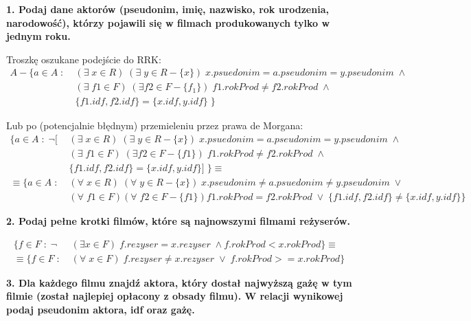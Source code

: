 \documentclass{article}
\begin{document}
\begin{solution}
  \textbf{\color{green}1. Podaj dane aktorów (pseudonim, imię, nazwisko, rok urodzenia, narodowość), którzy pojawili się w filmach produkowanych tylko w jednym roku.}

  Troszkę oszukane podejście do RRK:
  \begin{align*}
    A-\{a\in A\;:\; &(\exists\;x\in R)\;(\exists\;y\in R-\{x\})\;x.psuedonim = a.pseudonim = y.pseudonim\;\land\; \\ 
                    &(\exists\;f1\in F)\;(\exists f2\in F-\{f_1\})\;f1.rokProd \neq f2.rokProd \;\land\; \\ 
                    &\{f1.idf, f2.idf\}=\{x.idf, y.idf\}\;
                                     \}
  \end{align*}

  Lub po (potencjalnie błędnym) przemieleniu przez prawa de Morgana:
  \begin{align*}
    \{a\in A\;:\; \neg [&(\exists\;x\in R)\;(\exists\;y\in R-\{x\})\;x.psuedonim = a.pseudonim = y.pseudonim\;\land\; \\ 
                    &(\exists\;f1\in F)\;(\exists f2\in F-\{f1\})\;f1.rokProd \neq f2.rokProd \;\land\; \\ 
                    &\{f1.idf, f2.idf\}=\{x.idf, y.idf\}]\;
                                     \}\equiv\\ 
      \equiv\{a\in A\;:\;& (\forall\;x\in R)\;(\forall\;y\in R-\{x\})\; x.pseudonim\neq a.psuedonim\neq y.pseudonim\;\lor\;\\ 
                         &(\forall\;f1\in F)(\forall\;f2\in F-\{f1\}) f1.rokProd=f2.rokProd\;\lor\; \{f1.idf, f2.idf\}\neq \{x.idf, y.idf\}  \}
  \end{align*}

  \textbf{\color{green}2. Podaj pełne krotki filmów, które są najnowszymi filmami reżyserów.}

  \begin{align*}
    \{f\in F\;:\; \neg&(\exists x\in F)\; f.rezyser = x.rezyser \;\land f.rokProd < x.rokProd\}\equiv \\ 
    \equiv \{f\in F\;:\;&(\forall\;x\in F)\;f.rezyser\neq x.rezyser\;\lor\;f.rokProd >= x.rokProd\}
  \end{align*}

  \textbf{\color{green}3. Dla każdego filmu znajdź aktora, który dostał najwyższą gażę w tym filmie (został najlepiej opłacony z obsady filmu). W relacji wynikowej podaj pseudonim aktora, idf oraz gażę.}


\end{solution}
\end{document}
